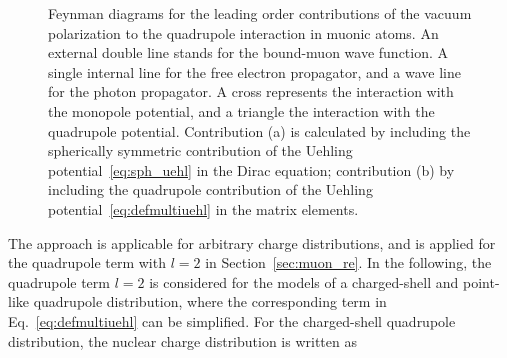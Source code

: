 %
\begin{figure}[t]%
\centering
{}
\hspace{2cm}
\caption{
Feynman diagrams for the leading order contributions of the vacuum polarization to the quadrupole interaction in muonic atoms. An external double line stands for the bound-muon wave function. A single internal line for the free electron propagator, and a wave line for the photon propagator. A cross represents the interaction with the monopole potential, and a triangle the interaction with the quadrupole potential. Contribution (a) is calculated by including the spherically symmetric contribution of the Uehling potential~\eqref{eq:sph_uehl} in the Dirac equation; contribution (b) by including the quadrupole contribution of the Uehling potential~\eqref{eq:defmultiuehl} in the matrix elements.
}
\label{fig:quehl}
\end{figure}
%
The approach is applicable for arbitrary charge distributions, and is applied for the quadrupole term with $l=2$ in Section~\ref{sec:muon_re}. In the following, the quadrupole term $l=2$ is considered for the models of a charged-shell and point-like quadrupole distribution, where the corresponding term in Eq.~\eqref{eq:defmultiuehl} can be simplified. For the charged-shell quadrupole distribution, the nuclear charge distribution is written as
